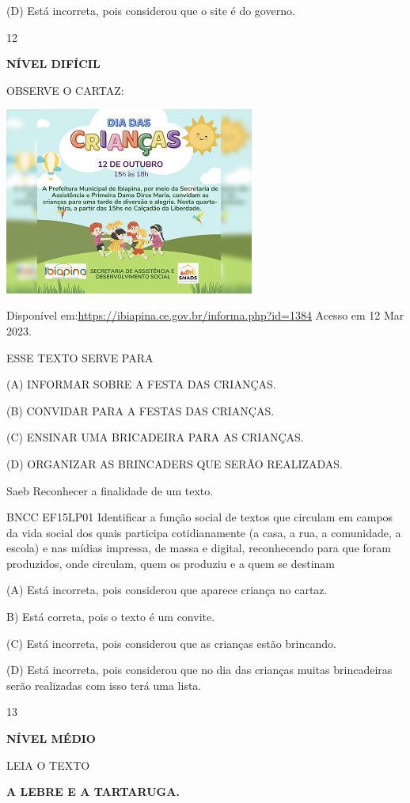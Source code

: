 {{(D) Está incorreta, pois considerou que o site é do governo.

\num{12}

\textbf{NÍVEL DIFÍCIL}

OBSERVE O CARTAZ:

\includegraphics[width=3.22436in,height=2.42060in]{media/image181.jpeg}

Disponível em:\url{https://ibiapina.ce.gov.br/informa.php?id=1384}
Acesso em 12 Mar 2023.

ESSE TEXTO SERVE PARA

(A) INFORMAR SOBRE A FESTA DAS CRIANÇAS.

(B) CONVIDAR PARA A FESTAS DAS CRIANÇAS.

(C) ENSINAR UMA BRICADEIRA PARA AS CRIANÇAS.

(D) ORGANIZAR AS BRINCADERS QUE SERÃO REALIZADAS.

Saeb Reconhecer a finalidade de um texto.

BNCC EF15LP01 Identificar a função social de textos que circulam em
campos da vida social dos quais participa cotidianamente (a casa, a rua,
a comunidade, a escola) e nas mídias impressa, de massa e digital,
reconhecendo para que foram produzidos, onde circulam, quem os produziu
e a quem se destinam

(A) Está incorreta, pois considerou que aparece criança no cartaz.

B) Está correta, pois o texto é um convite.

(C) Está incorreta, pois considerou que as crianças estão brincando.

(D) Está incorreta, pois considerou que no dia das crianças muitas
brincadeiras serão realizadas com isso terá uma lista.

\num{13}

\textbf{NÍVEL MÉDIO}

LEIA O TEXTO

\textbf{A LEBRE E A TARTARUGA.}

}}
